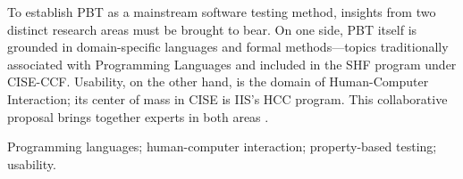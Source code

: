 

To establish PBT as a mainstream software
testing method, insights from two distinct research areas must be
brought to bear.
On one side, PBT itself is grounded in domain-specific languages and
formal methods---topics traditionally associated with Programming
Languages and included in the SHF
program under CISE-CCF.  Usability, on the other hand, is the domain
of Human-Computer Interaction; its center of mass in CISE is IIS's
HCC program.  This collaborative proposal brings together
experts in
both areas\iflater {} \fi.

\smallskip

 Programming languages; human-computer
interaction; property-based testing; usability.

